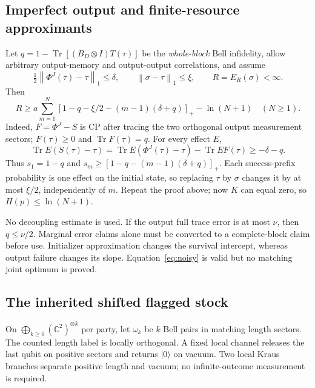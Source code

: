 \documentclass[11pt,a4paper]{article}
\numberwithin{equation}{section}
\theoremstyle{remark}
\newcommand{\tr}{\operatorname{Tr}}
\newcommand{\ER}{E_R}
\newcommand{\normone}[1]{\left\|#1\right\|_1}
\newcommand{\pos}[1]{\left[#1\right]_+}
\newcommand{\ket}[1]{|#1\rangle}
\begin{document}
\subsection{Imperfect output and finite-resource approximants}
Let \(q=1-\tr[(B_D\otimes I)T(\tau)]\) be the \emph{whole-block}
Bell infidelity, allow arbitrary output-memory and output-output
correlations, and assume
\[
 \tfrac12\normone{\Phi^J(\tau)-\tau}\leq\delta,\qquad
 \normone{\sigma-\tau}\leq\xi,\qquad R=\ER(\sigma)<\infty.
\]
Then
\begin{equation}
 R\geq a\sum_{m=1}^N
 \pos{1-q-\xi/2-(m-1)(\delta+q)}-\ln(N+1)
 \quad(N\geq1).                                 \label{eq:noisy}
\end{equation}
Indeed, \(F=\Phi^J-S\) is CP after tracing the two orthogonal output
measurement sectors; \(F(\tau)\geq0\) and \(\tr F(\tau)=q\).
For every effect \(E\),
\[
 \tr E(S(\tau)-\tau)
 =\tr E(\Phi^J(\tau)-\tau)-\tr E F(\tau)\geq-\delta-q.
\]
Thus \(s_1=1-q\) and
\(s_m\geq[1-q-(m-1)(\delta+q)]_+\).
Each success-prefix probability is one effect on the initial state,
so replacing \(\tau\) by \(\sigma\) changes it by at most \(\xi/2\),
independently of \(m\). Repeat the proof above; now \(K\) can equal zero,
so \(H(p)\leq\ln(N+1)\).

No decoupling estimate is used. If the output full trace error is at most
\(\nu\), then \(q\leq\nu/2\). Marginal error claims alone must be
converted to a complete-block claim before use. Initializer approximation
changes the survival intercept, whereas output failure changes its slope.
Equation~\eqref{eq:noisy} is valid but no matching joint optimum is proved.

\subsection{The inherited shifted flagged stock}
On \(\bigoplus_{k\geq0}(\mathbb C^2)^{\otimes k}\) per party, let
\(\omega_k\) be \(k\) Bell pairs in matching length sectors.
The counted length label is locally orthogonal. A fixed local channel
releases the last qubit on positive sectors and returns \(\ket0\) on
vacuum. Two local Kraus branches separate positive length and vacuum;
no infinite-outcome measurement is required.
\end{document}
